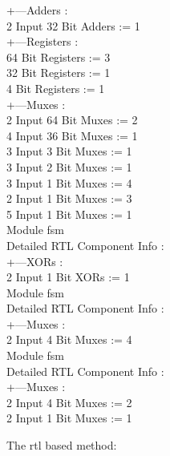 \documentclass[paper=b4, fontsize=11pt]{scrartcl} %
\numberwithin{equation}{section} %
\numberwithin{figure}{section} %
\numberwithin{table}{section} %
\begin{document}
+---Adders : \\
	   2 Input     32 Bit       Adders := 1 \\
+---Registers : \\
	               64 Bit    Registers := 3 \\
	               32 Bit    Registers := 1 \\
	                4 Bit    Registers := 1 \\
+---Muxes :                                 \\
	   2 Input     64 Bit        Muxes := 2 \\
	   4 Input     36 Bit        Muxes := 1 \\
	   3 Input      3 Bit        Muxes := 1 \\
	   3 Input      2 Bit        Muxes := 1 \\
	   3 Input      1 Bit        Muxes := 4 \\
	   2 Input      1 Bit        Muxes := 3 \\
	   5 Input      1 Bit        Muxes := 1 \\
Module fsm\\
Detailed RTL Component Info :               \\
+---XORs :                                  \\
	   2 Input      1 Bit         XORs := 1 \\
Module fsm \\
Detailed RTL Component Info :               \\
+---Muxes :                                 \\
	   2 Input      4 Bit        Muxes := 4 \\
Module fsm                       \\
Detailed RTL Component Info :               \\
+---Muxes :                                 \\
	   2 Input      4 Bit        Muxes := 2 \\
	   2 Input      1 Bit        Muxes := 1


The rtl based method:
\end{document}
